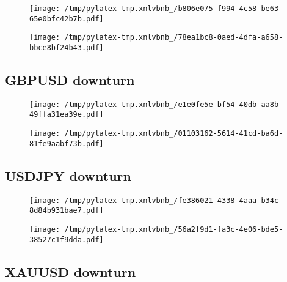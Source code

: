 \documentclass{article}%
\begin{document}
\begin{figure}[htbp]%
\centering%
\texttt{[image: /tmp/pylatex-tmp.xnlvbnb\_/b806e075-f994-4c58-be63-65e0bfc42b7b.pdf]}%
\end{figure}

%


\begin{figure}[htbp]%
\centering%
\texttt{[image: /tmp/pylatex-tmp.xnlvbnb\_/78ea1bc8-0aed-4dfa-a658-bbce8bf24b43.pdf]}%
\end{figure}

%
\newpage %
\subsection{GBPUSD downturn}%
\label{subsec:GBPUSDdownturn}%


\begin{figure}[htbp]%
\centering%
\texttt{[image: /tmp/pylatex-tmp.xnlvbnb\_/e1e0fe5e-bf54-40db-aa8b-49ffa31ea39e.pdf]}%
\end{figure}

%


\begin{figure}[htbp]%
\centering%
\texttt{[image: /tmp/pylatex-tmp.xnlvbnb\_/01103162-5614-41cd-ba6d-81fe9aabf73b.pdf]}%
\end{figure}

%
\newpage %
\subsection{USDJPY downturn}%
\label{subsec:USDJPYdownturn}%


\begin{figure}[htbp]%
\centering%
\texttt{[image: /tmp/pylatex-tmp.xnlvbnb\_/fe386021-4338-4aaa-b34c-8d84b931bae7.pdf]}%
\end{figure}

%


\begin{figure}[htbp]%
\centering%
\texttt{[image: /tmp/pylatex-tmp.xnlvbnb\_/56a2f9d1-fa3c-4e06-bde5-38527c1f9dda.pdf]}%
\end{figure}

%
\newpage %
\subsection{XAUUSD downturn}%
\label{subsec:XAUUSDdownturn}%
\end{document}
